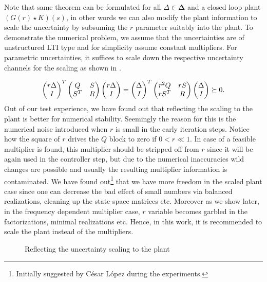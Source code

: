 \begin{rem}

Note that same theorem can be formulated for all $\Delta\in\bm{\Delta}$ and a closed loop plant $(G(r)\star K) (s)$,
in other words we can also modify the plant information to scale the uncertainty by subsuming the $r$ parameter suitably into the 
plant.
To demonstrate the numerical problem, we assume that the uncertainties are of unstructured LTI type and for simplicity assume constant multipliers. 
For parametric uncertainties, it suffices to scale down the respective uncertainty channels for the scaling as shown in . 

\[
\begin{pmatrix}r\Delta\\I\end{pmatrix}^T\begin{pmatrix}Q&S\\S^T&R\end{pmatrix}\begin{pmatrix}r\Delta\\I\end{pmatrix} = \begin{pmatrix}\Delta\\I\end{pmatrix}^T\begin{pmatrix}r^2 Q&rS\\rS^T&R\end{pmatrix}\begin{pmatrix}\Delta\\I\end{pmatrix}\succeq 0.
\]
Out of our test experience, we have found out that reflecting the scaling to the plant is better for numerical stability. Seemingly the reason for 
this is the numerical noise introduced when $r$ is small in the early iteration steps. Notice how the square of $r$ drives the $Q$ block to zero
if $0<r\ll 1$. In case of a feasible multiplier is found, this multiplier should be stripped off from $r$ since it will be again used in the 
controller step, but due to the numerical inaccuracies wild changes are possible and usually the resulting multiplier information is contaminated. 
We have found out\footnote{Initially suggested by C\'esar L\'opez during the experiments.} that we have more freedom in the scaled plant case since
one can decrease the bad effect of small numbers via balanced realizations, cleaning up the state-space matrices etc. Moreover as we show later,
in the frequency dependent multiplier case, $r$ variable becomes garbled in the factorizations, minimal realizations etc. Hence, in this work, it 
is recommended to scale the plant instead of the multipliers.
\end{rem}

\begin{figure}%
\centering%
\caption{Reflecting the uncertainty scaling to the plant}%
\label{fig:uncscale}%
\end{figure}


